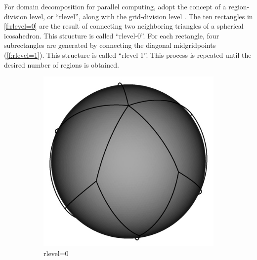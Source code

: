 For domain decomposition for parallel computing, \NICAM adopt the
concept of a region-division level, or ``rlevel'', along with the
grid-division level \citep{Tomita:2008jc}.
%
The ten rectangles in \autoref{f:rlevel=0} are the
result of connecting two neighboring triangles of a spherical
icosahedron.
%
This structure is called ``rlevel-0''.
%
For each rectangle, four subrectangles are generated by connecting the
diagonal midgridpoints (\autoref{f:rlevel=1}).
This structure is called ``rlevel-1''.
%
This process is repeated until the desired number of regions is
obtained.



\begin{figure}[htb]
\centering
\begin{subfigure}{.3\textwidth}
\centering
\includegraphics[width=\textwidth]{figs/Tomita_etal_2008_SIAM-8-0.png}
\caption{rlevel=0}\label{f:rlevel=0}
\end{subfigure}
\begin{subfigure}{.3\textwidth}
\centering

\end{subfigure}
\end{figure}
